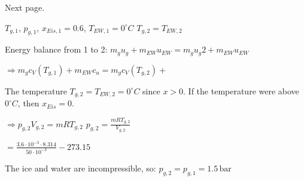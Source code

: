Next page.

\( T_{g,1} \), \( p_{g,1} \), \( x_{Eis,1} = 0.6 \), \( T_{EW,1} = 0^\circ C \)  
\( T_{g,2} = T_{EW,2} \)  

Energy balance from 1 to 2:  
\( m_g u_g + m_{EW} u_{EW} = m_g u_g2 + m_{EW} u_{EW} \)  

\( \Rightarrow m_g c_V (T_{g,1}) + m_{EW} c_u = m_g c_V (T_{g,2}) + \)  

The temperature \( T_{g,2} = T_{EW,2} = 0^\circ C \) since \( x > 0 \).  
If the temperature were above \( 0^\circ C \), then \( x_{Eis} = 0 \).  

\( \Rightarrow p_{g,2} V_{g,2} = m R T_{g,2} \)  
\( p_{g,2} = \frac{m R T_{g,2}}{V_{g,2}} \)  

\( = \frac{3.6 \cdot 10^{-3} \cdot 8.314}{50 \cdot 10^{-3}} - 273.15 \)  

The ice and water are incompressible, so:  
\( p_{g,2} = p_{g,1} = 1.5 \, \text{bar} \)